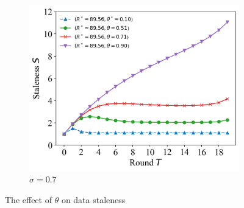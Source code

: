 \documentclass{article}
\theoremstyle{plain}
\theoremstyle{definition}
\theoremstyle{remark}
\begin{document}
\begin{figure}
\begin{subfigure}{0.31\textwidth}
		\centering
		\includegraphics[width=\textwidth]{figures/figure_64_C.png}
    \caption{$\sigma=0.7$}
	\end{subfigure}
	\caption{The effect of $\theta$ on data staleness}
\end{figure}
\end{document}
